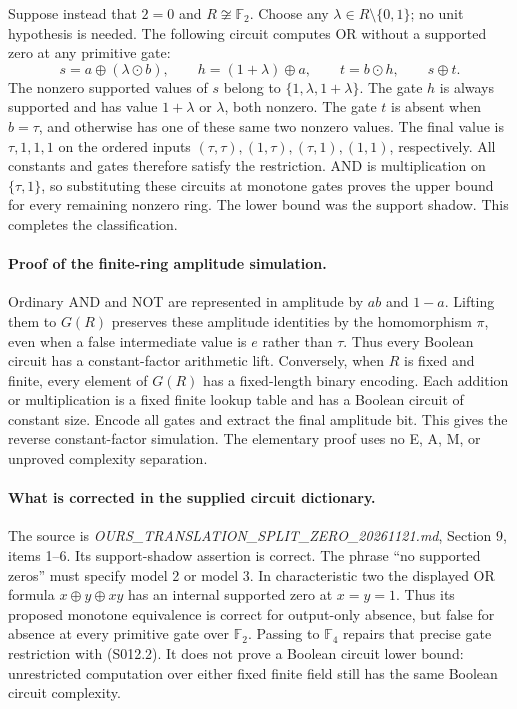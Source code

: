 Suppose instead that $2=0$ and $R\not\cong\mathbb F_2$.
Choose any $\lambda\in R\setminus\{0,1\}$; no unit hypothesis is
needed. The following circuit computes OR without a supported zero
at any primitive gate:
\[
 s=a\oplus(\lambda\odot b),\qquad
 h=(1+\lambda)\oplus a,\qquad
 t=b\odot h,\qquad s\oplus t.                         \tag{S012.2}
\]
The nonzero supported values of $s$ belong to
$\{1,\lambda,1+\lambda\}$. The gate $h$ is always supported and has
value $1+\lambda$ or $\lambda$, both nonzero. The gate $t$ is absent
when $b=\tau$, and otherwise has one of these same two nonzero values.
The final value is $\tau,1,1,1$ on the ordered inputs
$(\tau,\tau),(1,\tau),(\tau,1),(1,1)$, respectively. All constants
and gates therefore satisfy the restriction. AND is multiplication
on $\{\tau,1\}$, so substituting these circuits at monotone gates
proves the upper bound for every remaining nonzero ring. The lower
bound was the support shadow. This completes the classification.

\paragraph{Proof of the finite-ring amplitude simulation.}
Ordinary AND and NOT are represented in amplitude by $ab$ and $1-a$.
Lifting them to $G(R)$ preserves these amplitude identities by the
homomorphism $\pi$, even when a false intermediate value is $e$ rather
than $\tau$. Thus every Boolean circuit has a constant-factor
arithmetic lift. Conversely, when $R$ is fixed and finite, every
element of $G(R)$ has a fixed-length binary encoding. Each addition
or multiplication is a fixed finite lookup table and has a Boolean
circuit of constant size. Encode all gates and extract the final
amplitude bit. This gives the reverse constant-factor simulation.
The elementary proof uses no E, A, M, or unproved complexity separation.

\paragraph{What is corrected in the supplied circuit dictionary.}
The source is \emph{OURS\_TRANSLATION\_SPLIT\_ZERO\_20261121.md},
Section 9, items 1--6. Its support-shadow assertion is correct.
The phrase ``no supported zeros'' must specify model 2 or model 3.
In characteristic two the displayed OR formula
$x\oplus y\oplus xy$ has an internal supported zero at $x=y=1$.
Thus its proposed monotone equivalence is correct for output-only
absence, but false for absence at every primitive gate over
$\mathbb F_2$. Passing to $\mathbb F_4$ repairs that precise gate
restriction with (S012.2). It does not prove a Boolean circuit lower
bound: unrestricted computation over either fixed finite field still
has the same Boolean circuit complexity.

